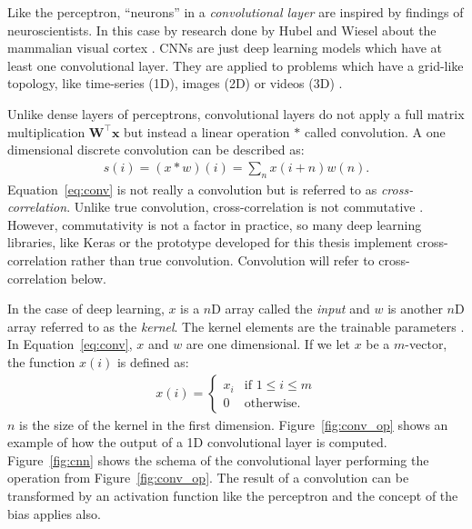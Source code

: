 \documentclass[]{article}
\begin{document}
Like the perceptron, ``neurons'' in a \textit{convolutional layer}
are inspired by findings of neuroscientists.
In this case by research done by Hubel and Wiesel about the
mammalian visual cortex
\citep{hubel_et_al_1959, hubel_et_al_1962, hubel_et_al_1968}.
CNNs are just deep learning models which have at least one
convolutional layer. They are applied to problems which have a
grid-like topology, like time-series (1D), images (2D) or videos (3D)
\citep{goodfellow_et_al_2016}.

Unlike dense layers of perceptrons, convolutional layers do not apply
a full matrix multiplication $\mathbf{W}^\top\mathbf{x}$ but instead
a linear operation $*$ called convolution.
A one dimensional discrete convolution can be described as:
\begin{align}
  \label{eq:conv}
  s(i) = (x * w)(i) = \sum_n x(i + n)w(n).
\end{align}
Equation~\ref{eq:conv} is not really a convolution but is referred to
as \textit{cross-correlation}.
Unlike true convolution, cross-correlation is not commutative
\citep{goodfellow_et_al_2016}.
However, commutativity is not a factor in practice, so many deep
learning libraries, like Keras \citep{keras} or the prototype
developed for this thesis implement cross-correlation rather than true
convolution.
Convolution will refer to cross-correlation below.

In the case of deep learning, $x$ is a $n$D array called the
\textit{input} and $w$ is another $n$D array referred to as the
\textit{kernel}. The kernel elements are the trainable parameters
\citep{goodfellow_et_al_2016}.
In Equation~\ref{eq:conv}, $x$ and $w$ are one dimensional.
If we let $x$ be a $m$-vector, the function $x(i)$ is defined as:
\begin{align}
  \label{eq:valid_conv}
  x(i) = \begin{cases}
    x_i &\text{if } 1 \leq i \leq m \\
    0 &\text{otherwise.}
  \end{cases}
\end{align}
$n$ is the size of the kernel in the first dimension.
Figure~\ref{fig:conv_op} shows an example of how the output of a
1D convolutional layer is computed.
Figure~\ref{fig:cnn} shows the schema of the convolutional
layer performing the operation from Figure~\ref{fig:conv_op}.
The result of a convolution can be transformed by an activation
function like the perceptron and the concept of the bias applies also.
\end{document}
